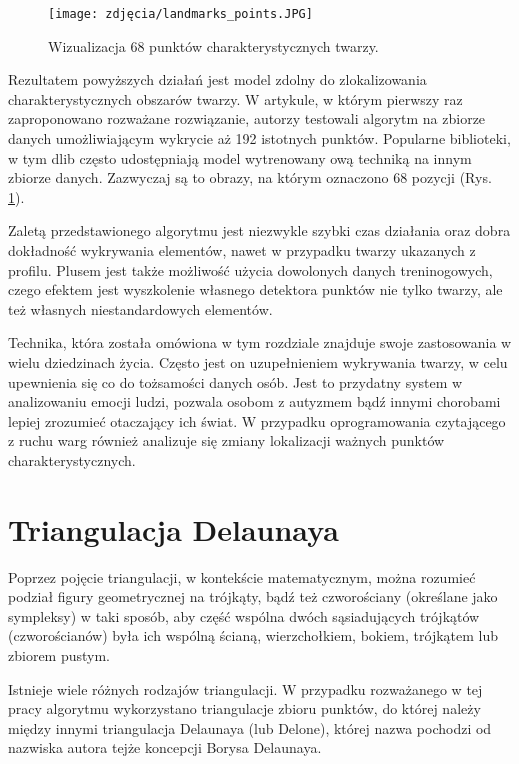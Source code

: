 \begin{figure}[h]
	\centering
	\texttt{[image: zdjęcia/landmarks\_points.JPG]}
	\caption{Wizualizacja 68 punktów charakterystycznych twarzy.} 
	\label{fig:landmarks}
\end{figure}

Rezultatem powyższych działań jest model zdolny do zlokalizowania charakterystycznych obszarów twarzy. W artykule, w którym pierwszy raz zaproponowano rozważane rozwiązanie, autorzy testowali algorytm na zbiorze danych umożliwiającym wykrycie aż 192 istotnych punktów. Popularne biblioteki, w tym dlib często udostępniają model wytrenowany ową techniką na innym zbiorze danych. Zazwyczaj są to obrazy, na którym oznaczono 68 pozycji (Rys. \ref{fig:landmarks}).

Zaletą przedstawionego algorytmu jest niezwykle szybki czas działania oraz dobra dokładność wykrywania elementów, nawet w przypadku twarzy ukazanych z profilu. Plusem jest także możliwość użycia dowolonych danych treninogowych, czego efektem jest wyszkolenie własnego detektora punktów nie tylko twarzy, ale też własnych niestandardowych elementów.

Technika, która została omówiona w tym rozdziale znajduje swoje zastosowania w wielu dziedzinach życia. Często jest on uzupełnieniem wykrywania twarzy, w celu upewnienia się co do tożsamości danych osób. Jest to przydatny system w analizowaniu emocji ludzi, pozwala osobom z autyzmem bądź innymi chorobami lepiej zrozumieć otaczający ich świat. W przypadku oprogramowania czytającego z ruchu warg również analizuje się zmiany lokalizacji ważnych punktów charakterystycznych.

\section{Triangulacja Delaunaya}
Poprzez pojęcie triangulacji, w kontekście matematycznym, można rozumieć podział figury geometrycznej na trójkąty, bądź też czworościany (określane jako sympleksy) w taki sposób, aby część wspólna dwóch sąsiadujących trójkątów (czworościanów) była ich wspólną ścianą, wierzchołkiem, bokiem, trójkątem lub zbiorem pustym. \cite{triangulation}

Istnieje wiele różnych rodzajów triangulacji. W przypadku rozważanego w tej pracy algorytmu wykorzystano triangulacje zbioru punktów, do której należy między innymi triangulacja Delaunaya (lub Delone), której nazwa pochodzi od nazwiska autora tejże koncepcji Borysa Delaunaya. 

